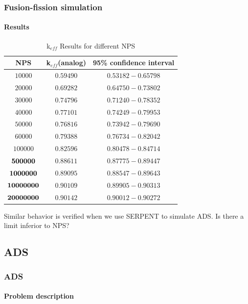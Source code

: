 \documentclass[svgnames,smaller,table]{beamer}
\begin{document}
\begin{frame}
  \frametitle{Fusion-fission simulation}
  \framesubtitle{Results}
  

\begin{table}[htb!]
\caption{k$_{eff}$ Results for different NPS}
\label{NPS}
\centering
\vspace{0.5cm}
\begin{tabular}{c|c|c}\hline
NPS & k$_{eff}$(analog) & 95\% confidence interval\\ \hline

$10000$ & $0.59490$ & $0.53182-0.65798$\\ \hline
$20000$ & $0.69282$ & $0.64750-0.73802$\\ \hline
$30000$ & $0.74796$ & $0.71240-0.78352$\\ \hline
$40000$ & $0.77101$ & $0.74249-0.79953$\\ \hline
$50000$ & $0.76816$ & $0.73942-0.79690$\\ \hline
$60000$ & $0.79388$ & $0.76734-0.82042$\\ \hline
$100000$ & $0.82596$ & $0.80478-0.84714$\\ \hline
${\bf 500000}$ & $0.88611$ & $0.87775-0.89447$\\ \hline
${\bf 1000000}$ & $0.89095$ & $0.88547-0.89643$\\ \hline
${\bf 10000000}$ & $0.90109$ & $0.89905-0.90313$\\ \hline
${\bf 20000000}$ & $0.90142$ & $0.90012-0.90272$\\ \hline
\end{tabular}
\end{table}

Similar behavior is verified when we use SERPENT to simulate ADS. Is there a limit inferior to NPS?
\end{frame}


\subsection{ADS}
\begin{frame}
  \frametitle{ADS}
  \framesubtitle{Problem description}
\end{frame}
\end{document}
